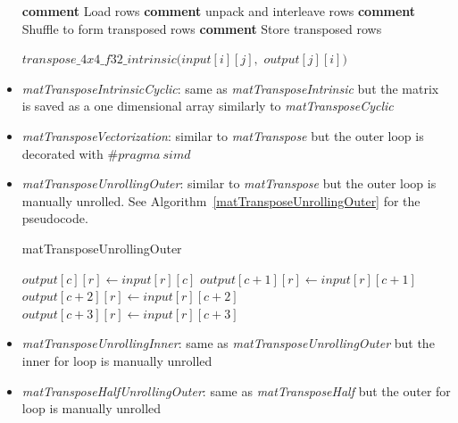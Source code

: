 \documentclass[conference]{IEEEtran}
\begin{document}
\begin{itemize}
\begin{algorithm}
\begin{algorithmic}[1]
    \State \textbf{comment} Load rows  
    \State \textbf{comment} unpack and interleave rows
    \State \textbf{comment} Shuffle to form transposed rows
    \State \textbf{comment} Store transposed rows
      \EndProcedure
      
      \fi

        \State $transpose\_4x4\_f32\_intrinsic(input[i][j],$
        \State $                               output[j][i])$
        \EndFor
        \EndFor

    \end{algorithmic}
    \end{algorithm}

\item \textit{matTransposeIntrinsicCyclic}: same as \textit{matTransposeIntrinsic} but the matrix is saved as a one dimensional array similarly to \textit{matTransposeCyclic}
\item \textit{matTransposeVectorization}: similar to \textit{matTranspose} but the outer loop is decorated with $\# pragma\ simd $
\item \textit{matTransposeUnrollingOuter}: similar to \textit{matTranspose} but the outer loop is manually unrolled. See Algorithm~\ref{matTransposeUnrollingOuter} for the pseudocode.

  \begin{algorithm}
    \caption{matTransposeUnrollingOuter}\label{matTransposeUnrollingOuter}
    \begin{algorithmic}[1]
            \State $output[c][r] \gets input[r][c]$
            \State $output[c+1][r] \gets input[r][c+1]$
            \State $output[c+2][r] \gets input[r][c+2]$
            \State $output[c+3][r] \gets input[r][c+3]$
            \EndFor
        \EndFor
    \end{algorithmic}
  \end{algorithm}

\item \textit{matTransposeUnrollingInner}: same as \textit{matTransposeUnrollingOuter} but the inner for loop is manually unrolled

\iffalse
\item \textit{matTransposeHalfUnrollingOuter}: same as \textit{matTransposeHalf} but the outer for loop is manually unrolled


\end{itemize}
\end{document}
